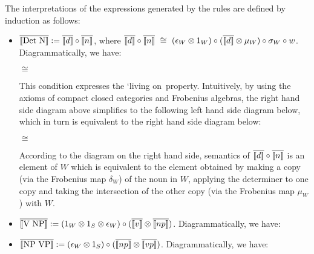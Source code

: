 \bigskip
The  interpretations of the expressions  generated by the rules are defined  by induction as follows:




\begin{itemize}
\item  $\overline{[\![ \mbox{Det N} ]\!]} := \overline{[\![ d ]\!]} \circ \overline{[\![ n ]\!]}$, where  $
\overline{[\![ d ]\!]} \circ \overline{[\![ n ]\!]} \ \cong \ (\epsilon_W \otimes 1_W) \circ (\overline{[\![ d ]\!]} \otimes \mu_W) \circ \sigma_W \circ w$. Diagrammatically, we have:

\begin{center}
 \qquad $\cong$ \qquad {}  
\end{center}

\noindent
This condition expresses the `living on\ property.  Intuitively,  by using the axioms of compact closed categories and Frobenius algebras,  the right hand side diagram above simplifies to the following left hand side diagram below, which in turn is equivalent to the right hand side diagram below:

\begin{center}
  \qquad $\cong$ \qquad  {} 
 \end{center}
 
 \noindent
 According to the  diagram on the right hand side, semantics of  $\overline{[\![ d ]\!]} \circ \overline{[\![ n ]\!]}$ is an element of $W$ which is equivalent to the element obtained by making a copy (via the Frobenius map $\delta_W$) of the noun  in $W$,  applying the determiner  to one copy and taking the intersection of the other copy (via the Frobenius map $\mu_W$) with $W$. 
 

\item $\overline{[\![ \mbox{V NP} ]\!]} := (1_W \otimes 1_S \otimes \epsilon_W) \circ (\overline{[\![ v ]\!]} \otimes \overline{[\![ np ]\!]})$. Diagrammatically, we have:

\begin{center}
\end{center}

\item $\overline{[\![ \mbox{NP VP} ]\!]} := (\epsilon_W \otimes 1_S) \circ (\overline{[\![ np ]\!]} \otimes \overline{[\![ vp ]\!]})$. Diagrammatically, we have:

\begin{center}
\end{center}
\end{itemize}


